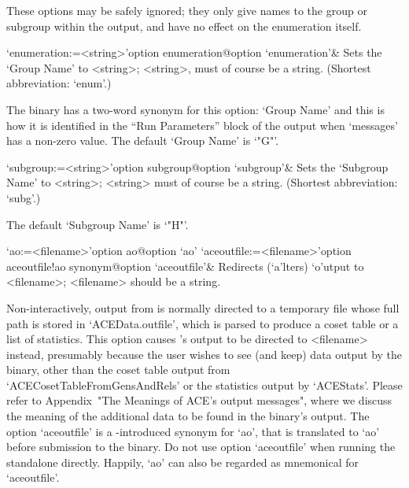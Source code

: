 \enditems


These options may be safely ignored; they only give names to the group
or subgroup within the {\ACE}  output,  and  have  no  effect  on  the
enumeration itself.

\beginitems

\>`enumeration:=<string>'{option enumeration}@{option `enumeration'}&
Sets the `Group Name' to <string>;  <string>,  must  of  course  be  a
string. (Shortest abbreviation: `enum'.)

The {\ACE} binary has a two-word synonym for this option: `Group Name'
and this is how it is identified in the ``Run  Parameters''  block  of
the {\ACE} output when `messages' has a non-zero  value.  The  default
`Group Name' is `"G"'.

\>`subgroup:=<string>'{option subgroup}@{option `subgroup'}& 
Sets the `Subgroup Name' to <string>; <string> must  of  course  be  a
string. (Shortest abbreviation: `subg'.)

The default `Subgroup Name' is `"H"'.

\enditems


\beginitems

\>`ao:=<filename>'{option ao}@{option `ao'}
\>`aceoutfile:=<filename>'{option aceoutfile!ao synonym}@{option `aceoutfile'}&
Redirects (`a'lters) `o'utput to <filename>; <filename>  should  be  a
string.

Non-interactively, output from {\ACE} is normally directed to a temporary
file whose full path is stored in `ACEData.outfile', which  is  parsed
to produce a coset table or a list of statistics. This  option  causes
{\ACE}'s output to  be  directed  to  <filename>  instead,  presumably
because the user wishes to see (and keep) data output  by  the  {\ACE}
binary,    other    than    the    coset     table     output     from
`ACECosetTableFromGensAndRels' or the statistics output by `ACEStats'.
Please refer to Appendix~"The  Meanings  of  ACE's  output  messages",
where we discuss the meaning of the additional data to be found in the
{\ACE} binary's output. The option `aceoutfile' is a {\GAP}-introduced
synonym for `ao', that is translated to `ao' before submission to  the
{\ACE} binary.  Do  not  use  option  `aceoutfile'  when  running  the
standalone directly. Happily, `ao' can also be regarded as  mnemonical
for `aceoutfile'.

